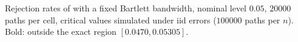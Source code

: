 Rejection rates of \RMGLS{} with a fixed Bartlett bandwidth, nominal level $0.05$, $20000$ paths per cell, critical values simulated under iid errors ($100000$ paths per $n$). Bold: outside the exact region $[0.0470, 0.05305]$.
